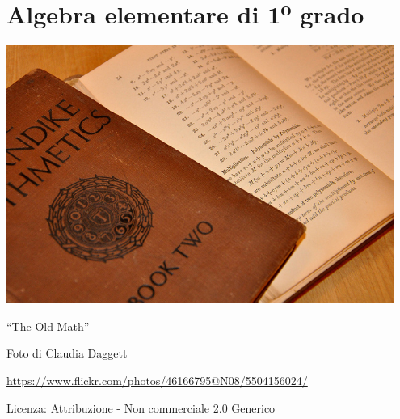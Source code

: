 \part{Algebra elementare di 1\textsuperscript{o} grado}

\includegraphics[width=0.95\textwidth]{img/old_math.jpg}
  \begin{center}
    {\large ``The Old Math''}\par
    Foto di Claudia Daggett\par
    \url{https://www.flickr.com/photos/46166795@N08/5504156024/}\par
    Licenza: Attribuzione - Non commerciale 2.0 Generico\par
  \end{center}
\clearpage
\cleardoublepage
